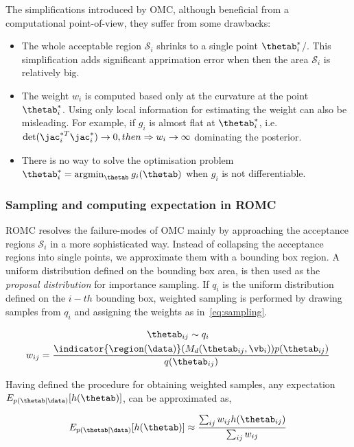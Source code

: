 The simplifications introduced by OMC, although beneficial from a
computational point-of-view, they suffer from some drawbacks:

\begin{itemize}
\item The whole acceptable region $\mathcal{S}_i$
  shrinks to a single point $\thetab_i^*$/. This simplification adds
  significant apprimation error when then the area $\mathcal{S}_i$ is relatively big.
\item The weight $w_i$ is computed based only at the curvature at the
  point $\thetab_i^*$. Using only local information for estimating the weight can also be misleading. For example, if $g_i$ is almost flat at $\thetab_i^*$, i.e. $\text{det}(\jac_i^{*T}\jac_i^*) \rightarrow 0, then \Rightarrow w_i
  \rightarrow \infty$ dominating the posterior.
\item There is no way to solve the optimisation problem
  $\thetab_i^* = \text{argmin}_{\thetab} \: g_i(\thetab)$ when $g_i$
  is not differentiable.
\end{itemize}

\subsubsection{Sampling and computing expectation in ROMC}

ROMC resolves the failure-modes of OMC mainly by approaching the
acceptance regions $\mathcal{S}_i$ in a more sophisticated
way. Instead of collapsing the acceptance regions into single points,
we approximate them with a bounding box region. A uniform distribution
defined on the bounding box area, is then used as the \emph{proposal
  distribution} for importance sampling. If $q_i$ is the uniform
distribution defined on the $i-th$ bounding box, weighted sampling is
performed by drawing samples from $q_i$ and assigning the weights as
in~\eqref{eq:sampling}.

\begin{gather}
  \thetab_{ij} \sim q_i \\  \label{eq:sampling}
  w_{ij} = \frac{\indicator{\region(\data)}(M_d(\thetab_{ij}, \vb_i)) p(\thetab_{ij})}{q(\thetab_{ij})}
\end{gather}

\noindent

Having defined the procedure for obtaining weighted samples, any
expectation $E_{p(\thetab|\data)}[h(\thetab)]$, can be approximated
as,

\begin{equation} \label{eq:expectation}
  E_{p(\thetab|\data)}[h(\thetab)] \approx \frac{\sum_{ij} w_{ij} h(\thetab_{ij})}{\sum_{ij} w_{ij}}
\end{equation}


